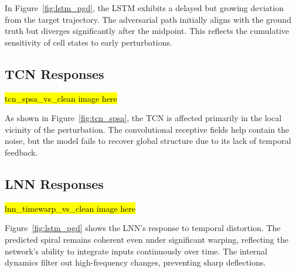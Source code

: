 
In Figure~\ref{fig:lstm_pgd}, the LSTM exhibits a delayed but growing deviation from the target trajectory. The adversarial path initially aligns with the ground truth but diverges significantly after the midpoint. This reflects the cumulative sensitivity of cell states to early perturbations.

\subsection{TCN Responses}

\hl{tcn\_spsa\_vs\_clean image here}


As shown in Figure~\ref{fig:tcn_spsa}, the TCN is affected primarily in the local vicinity of the perturbation. The convolutional receptive fields help contain the noise, but the model fails to recover global structure due to its lack of temporal feedback.

\subsection{LNN Responses}

\hl{lnn\_timewarp\_vs\_clean image here}


Figure~\ref{fig:lstm_pgd} shows the LNN's response to temporal distortion. The predicted spiral remains coherent even under significant warping, reflecting the network's ability to integrate inputs continuously over time. The internal dynamics filter out high-frequency changes, preventing sharp deflections.

